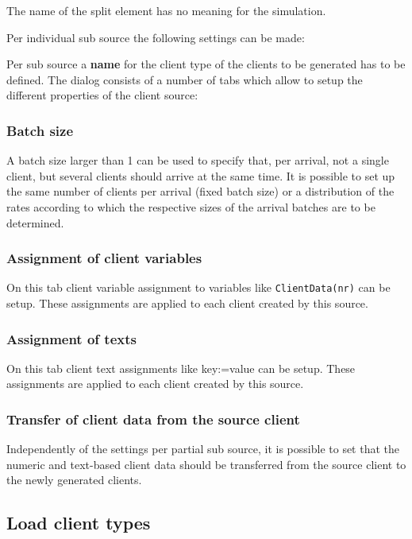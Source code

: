 The name of the split element has no meaning for the simulation.

Per individual sub source the following settings can be made:

Per sub source a \textbf{name} for the client type of the clients to be generated has to be defined.
The dialog consists of a number of tabs which allow to setup the different properties of the client source:

\subsubsection*{Batch size}

A batch size larger than 1 can be used to specify that, per arrival, not a single client,
but several clients should arrive at the same time. It is possible to set up the same number
of clients per arrival (fixed batch size) or a distribution of the rates according to which
the respective sizes of the arrival batches are to be determined.

\subsubsection*{Assignment of client variables}

On this tab client variable assignment to variables like \texttt{ClientData(nr)} can be setup.
These assignments are applied to each client created by this source.

\subsubsection*{Assignment of texts}

On this tab client text assignments like key:=value can be setup.
These assignments are applied to each client created by this source.

\subsubsection*{Transfer of client data from the source client}

Independently of the settings per partial sub source, it is possible to set that
the numeric and text-based client data should be transferred from the source client
to the newly generated clients.

\subsection*{Load client types}

